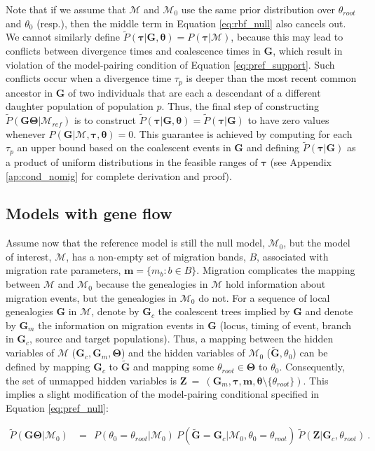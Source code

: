 \documentclass[11pt]{article}
\newcommand{\vect}[1]{\boldsymbol{\mathbf{#1}}}
\newcommand{\X}{\vect{X}}
\newcommand{\M}{\mathcal{M}}
\newcommand{\G}{\vect{G}}
\newcommand{\T}{\vect{\Theta}}
\newcommand{\GT}{\G\T}
\newcommand{\Mref}{\M_{ref}}
\newcommand{\Pref}{\widetilde{P}}
\newcommand{\Gref}{\widetilde{\G}}
\newcommand{\1}{\mathbbm{1}}
\newcommand{\Z}{\vect{Z}}
\newcommand{\troot}{\theta_{root}}
\newcommand{\Gc}{\G_c}
\newcommand{\Gm}{\G_m}
\newcommand{\taus}{\vect\tau}
\newcommand{\thetas}{\vect\theta}
\newcommand{\migs}{\vect{m}}
\begin{document}
Note that if we assume that $\M$ and $\M_0$ use the same prior distribution over $\theta_{root}$ and $\theta_0$ (resp.),
then the middle term in Equation \ref{eq:rbf_null} also cancels out.
%
We cannot similarly define $\Pref(\taus|\G,\thetas)=P(\taus|\M)$, because this may lead to conflicts between divergence times and coalescence times in $\G$, which result in violation of
the model-pairing condition of Equation \ref{eq:pref_support}.
%
Such conflicts occur when a divergence time $\tau_p$ is deeper than the most recent common ancestor
in $\G$ of two individuals that are each a descendant of a different daughter population of population $p$.
%
%
Thus, the final step of constructing $\Pref(\GT|\Mref)$ is to construct $\Pref(\taus|\G,\thetas)=\Pref(\taus|\G)$ to have zero values whenever $P(\G|\M,\taus,\thetas)=0$.
%
This guarantee is achieved by computing for each $\tau_p$ an upper bound based on the coalescent events in $\G$
and defining $\Pref(\taus|\G)$ as a product of uniform distributions in the feasible ranges of $\taus$
%
(see  Appendix \ref{ap:cond_nomig} for complete derivation and proof).


\subsection{Models with gene flow}

Assume now that the reference model is still the null model, $\M_0$, but the model of interest, $\M$, has a non-empty
set of migration bands, $B$, associated with migration rate parameters, $\migs=\{m_b:b\in B\}$.
%
Migration complicates the mapping between $\M$ and $\M_0$ because the genealogies in $\M$ hold information
about migration events, but the genealogies in $\M_0$ do not.
%
For a sequence of local genealogies $\G$ in $\M$, denote by $\Gc$ the coalescent trees implied by $\G$
and denote by $\Gm$ the information on migration events in $\G$ (locus, timing of event, branch in $\Gc$, source and target populations).
%
Thus, a mapping between the hidden variables of $\M$ ($\Gc,\Gm,\T$) and the hidden variables of $\M_0$ ($\Gref,\theta_0$) can be defined by
mapping $\Gc$ to $\Gref$ and mapping some $\troot\in\T$ to $\theta_0$.
%
Consequently, the set of unmapped hidden variables is $\Z~=~ (\Gm,\taus,\migs,\thetas\setminus\{\troot\})$.
%
This implies a slight modification of the model-pairing conditional specified in Equation \ref{eq:pref_null}:
%
%
\begin{small}
\begin{align}
 \Pref(\GT|\M_0)
 &=~~ 
 P(\theta_0=\troot|\M_0)\  P(\Gref=\Gc|\M_0,\theta_0=\troot)\ \Pref(\Z|\Gc,\troot)  ~ .\label{eq:pref_mig}
\end{align}
\end{small}
\end{document}
